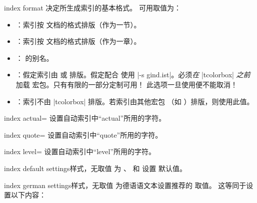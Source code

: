 \begin{docTcbKey}{index format}{%
  }{}
  决定所生成索引的基本格式。
  可用取值为：
  \begin{itemize}
  \item{}：索引按  文档的格式排版（作为一节）。
  \item{}：索引按  文档的格式排版（作为一章）。
  \item{}： 的别名。
  \item{}：假定索引由  或
     排版。假定配合 
    使用 |-s gind.ist|。必须\emph{在} |tcolorbox| \emph{之前}
    加载  宏包。只有有限的一部分定制可用！
    此选项一旦使用便不能取消！
  \item{}：索引不由 |tcolorbox| 排版。若索引由其他宏包
    （如 ）排版，则使用此值。
  \end{itemize}
\end{docTcbKey}


\begin{docTcbKey}{index actual}{=}{}
  设置自动索引中\enquote{actual}所用的字符。
\end{docTcbKey}

\begin{docTcbKey}{index quote}{=}{}
  设置自动索引中\enquote{quote}所用的字符。
\end{docTcbKey}

\begin{docTcbKey}{index level}{=}{\tcbdocdescInit{!}}
  设置自动索引中\enquote{level}所用的字符。
\end{docTcbKey}

\begin{docTcbKey}{index default settings}{}{样式，无取值}
  为 、
   和
   设置  默认值。
\end{docTcbKey}


\begin{docTcbKey}{index german settings}{}{样式，无取值}
  为德语语文本设置推荐的  取值。
  这等同于设置以下内容：
\begin{dispListing}
\end{dispListing}
\end{docTcbKey}


